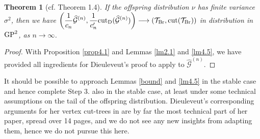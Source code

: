 \documentclass[11pt,a4paper]{article}
\newtheorem{thm}[prop]{Theorem}
\newcommand{\cG}{\mathcal{G}}
\newcommand{\cT}{\mathcal{T}}
\begin{document}
\begin{thm}[cf. \cite{Die13} Theorem 1.4] If the offspring distribution $\nu$ has finite variance $\sigma^2$,  then we have $\displaystyle\left(\frac{1}{c_n}\widehat{\cG}^{(n)},\frac{1}{c_n^\prime} {\rm cut}_{\rm D}(\widehat{\cG}^{(n)})\right)\longrightarrow\left(\cT_{\rm Br},{\rm cut}(\cT_{\rm Br})\right)$ in distribution in ${\rm GP}^2$, as $n\rightarrow\infty$.
\end{thm}
\begin{proof} With Proposition \ref{prop4.1} and Lemmas \ref{lm2.1} and \ref{lm4.5}, we have provided all ingredients for Dieuleveut's proof to apply to $\widehat{\cG}^{(n)}$.
\end{proof}

It should be possible to approach Lemmas \ref{bound} and \ref{lm4.5} in the stable case and hence complete Step 3. also in the stable case, at least under some 
technical assumptions on the tail of the offspring distribution. Dieuleveut's corresponding 
arguments for her vertex cut-trees in \cite[Section 2.3]{Die13} are by far the most technical part of her paper, spread over 14 pages, and we do not see any new insights 
from adapting them, hence we do not pursue this here.
\end{document}
